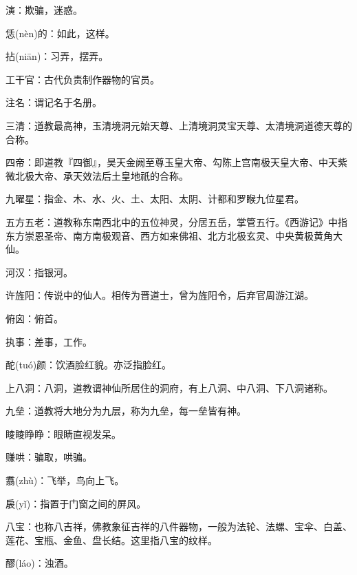 \startbuffer[221]
演：欺骗，迷惑。
\stopbuffer


\startbuffer[222]
恁(nèn)的：如此，这样。
\stopbuffer


\startbuffer[223]
拈(niān)：习弄，摆弄。
\stopbuffer


\startbuffer[224]
工干官：古代负责制作器物的官员。
\stopbuffer


\startbuffer[225]
注名：谓记名于名册。
\stopbuffer


\startbuffer[226]
三清：道教最高神，玉清境洞元始天尊、上清境洞灵宝天尊、太清境洞道德天尊的合称。
\stopbuffer


\startbuffer[227]
四帝：即道教『四御』，昊天金阙至尊玉皇大帝、勾陈上宫南极天皇大帝、中天紫微北极大帝、承天效法后土皇地祇的合称。
\stopbuffer


\startbuffer[228]
九曜星：指金、木、水、火、土、太阳、太阴、计都和罗睺九位星君。
\stopbuffer


\startbuffer[229]
五方五老：道教称东南西北中的五位神灵，分居五岳，掌管五行。《西游记》中指东方崇恩圣帝、南方南极观音、西方如来佛祖、北方北极玄灵、中央黄极黄角大仙。
\stopbuffer


\startbuffer[230]
河汉：指银河。
\stopbuffer


\startbuffer[231]
许旌阳：传说中的仙人。相传为晋道士，曾为旌阳令，后弃官周游江湖。
\stopbuffer


\startbuffer[232]
俯囟：俯首。
\stopbuffer


\startbuffer[233]
执事：差事，工作。
\stopbuffer


\startbuffer[234]
酡(tuó)颜：饮酒脸红貌。亦泛指脸红。
\stopbuffer


\startbuffer[235]
上八洞：八洞，道教谓神仙所居住的洞府，有上八洞、中八洞、下八洞诸称。
\stopbuffer


\startbuffer[236]
九垒：道教将大地分为九层，称为九垒，每一垒皆有神。
\stopbuffer


\startbuffer[237]
睖睖睁睁：眼睛直视发呆。
\stopbuffer


\startbuffer[238]
赚哄：骗取，哄骗。
\stopbuffer


\startbuffer[239]
翥(zhù)：飞举，鸟向上飞。
\stopbuffer


\startbuffer[240]
扆(yǐ)：指置于门窗之间的屏风。
\stopbuffer


\startbuffer[241]
八宝：也称八吉祥，佛教象征吉祥的八件器物，一般为法轮、法螺、宝伞、白盖、莲花、宝瓶、金鱼、盘长结。这里指八宝的纹样。
\stopbuffer


\startbuffer[242]
醪(láo)：浊酒。
\stopbuffer


